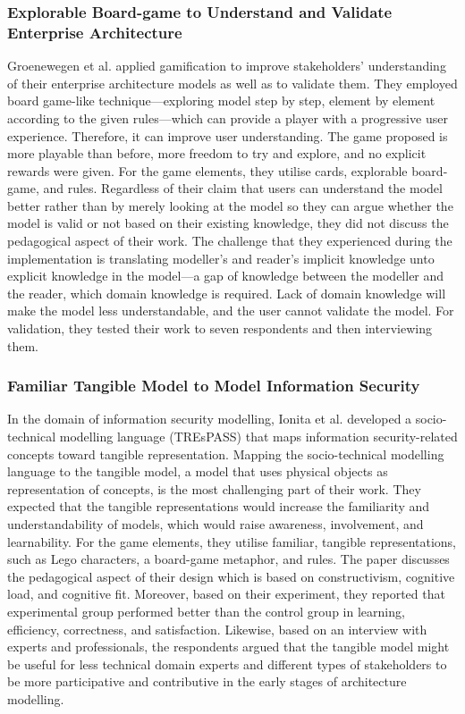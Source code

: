 \documentclass[12pt, a4paper]{report}
\begin{document}
{\subsubsection{Explorable Board-game to Understand and Validate Enterprise Architecture}
Groenewegen et al. \cite{Groenewegen2010} applied gamification to improve stakeholders' understanding of their enterprise architecture models as well as to validate them. They employed board game-like technique---exploring model step by step, element by element according to the given rules---which can provide a player with a progressive user experience. Therefore, it can improve user understanding. The game proposed is more playable than before, more freedom to try and explore, and no explicit rewards were given. For the game elements, they utilise cards, explorable board-game, and rules. Regardless of their claim that users can understand the model better rather than by merely looking at the model so they can argue whether the model is valid or not based on their existing knowledge, they did not discuss the pedagogical aspect of their work. The challenge that they experienced during the implementation is translating modeller's and reader's implicit knowledge unto explicit knowledge in the model---a gap of knowledge between the modeller and the reader, which domain knowledge is required. Lack of domain knowledge will make the model less understandable, and the user cannot validate the model. For validation, they tested their work to seven respondents and then interviewing them. 

\subsubsection{Familiar Tangible Model to Model Information Security}
In the domain of information security modelling, Ionita et al.\cite{Ionita2015} developed a socio-technical modelling language (TREsPASS) that maps information security-related concepts toward tangible representation. Mapping the socio-technical modelling language to the tangible model, a model that uses physical objects as representation of concepts, is the most challenging part of their work. They expected that the tangible representations would increase the familiarity and understandability of models, which would raise awareness, involvement, and learnability. For the game elements, they utilise familiar, tangible representations, such as Lego characters, a board-game metaphor, and rules. The paper discusses the pedagogical aspect of their design which is based on constructivism, cognitive load, and cognitive fit. Moreover, based on their experiment, they reported that experimental group performed better than the control group in learning, efficiency, correctness, and satisfaction. Likewise, based on an interview with experts and professionals, the respondents argued that the tangible model might be useful for less technical domain experts and different types of stakeholders to be more participative and contributive in the early stages of architecture modelling.

}
\end{document}
